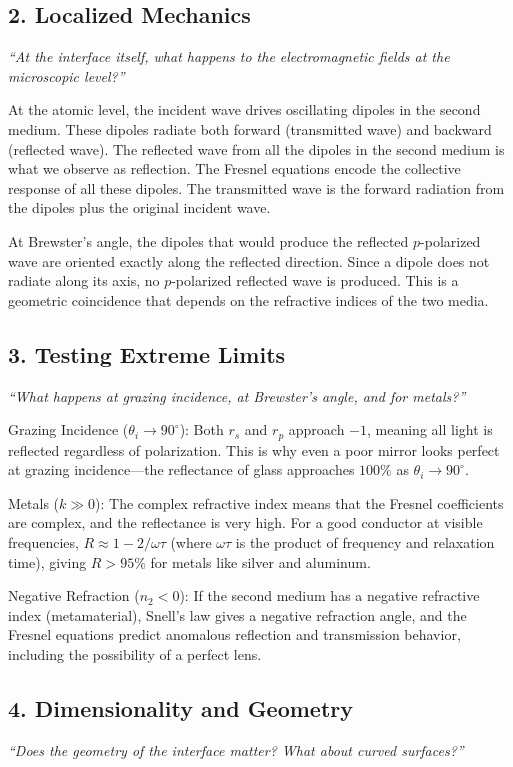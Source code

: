 \subsection*{2. Localized Mechanics}
\textit{``At the interface itself, what happens to the electromagnetic fields at the microscopic level?''}

At the atomic level, the incident wave drives oscillating dipoles in the second medium. These dipoles radiate both forward (transmitted wave) and backward (reflected wave). The reflected wave from all the dipoles in the second medium is what we observe as reflection. The Fresnel equations encode the collective response of all these dipoles. The transmitted wave is the forward radiation from the dipoles plus the original incident wave.

At Brewster's angle, the dipoles that would produce the reflected $p$-polarized wave are oriented exactly along the reflected direction. Since a dipole does not radiate along its axis, no $p$-polarized reflected wave is produced. This is a geometric coincidence that depends on the refractive indices of the two media.

\subsection*{3. Testing Extreme Limits}
\textit{``What happens at grazing incidence, at Brewster's angle, and for metals?''}

Grazing Incidence ($\theta_i \to 90^\circ$): Both $r_s$ and $r_p$ approach $-1$, meaning all light is reflected regardless of polarization. This is why even a poor mirror looks perfect at grazing incidence---the reflectance of glass approaches $100\%$ as $\theta_i \to 90^\circ$.

Metals ($k \gg 0$): The complex refractive index means that the Fresnel coefficients are complex, and the reflectance is very high. For a good conductor at visible frequencies, $R \approx 1 - 2/\omega\tau$ (where $\omega\tau$ is the product of frequency and relaxation time), giving $R > 95\%$ for metals like silver and aluminum.

Negative Refraction ($n_2 < 0$): If the second medium has a negative refractive index (metamaterial), Snell's law gives a negative refraction angle, and the Fresnel equations predict anomalous reflection and transmission behavior, including the possibility of a perfect lens.

\subsection*{4. Dimensionality and Geometry}
\textit{``Does the geometry of the interface matter? What about curved surfaces?''}


